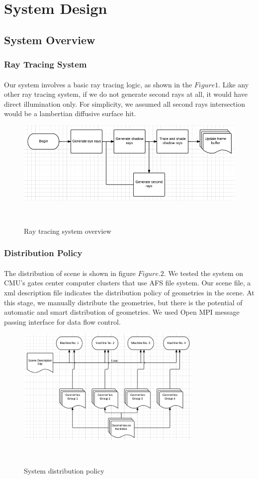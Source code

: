 \documentclass[a4paper, oneside, 10pt]{article}
\begin{document}
\section{System Design}
\subsection{System Overview}
\subsubsection{Ray Tracing System}
\paragraph{} Our system involves a basic ray tracing logic, as shown in the $Figure 1$. Like any other ray tracing system, if we do not generate second rays at all, it would have direct illumination only. For simplicity, we assumed all second rays intersection would be a lambertian diffusive surface hit.
\begin{figure}[h]
\includegraphics[width=\textwidth] {img1}
\caption{Ray tracing system overview}\
\end{figure}
\subsubsection{Distribution Policy}
\paragraph{}The distribution of scene is shown in figure $Figure. 2$. We tested the system on CMU’s gates center computer clusters that use AFS file system. Our scene file, a xml description file indicates the distribution policy of geometries in the scene. At this stage, we manually distribute the geometries, but there is the potential of automatic and smart distribution of geometries. We used Open MPI message passing interface for data flow control.
\begin{figure}[h]
\includegraphics[width=0.8\textwidth] {img2}
\caption{System distribution policy}\
\end{figure}
\end{document}
